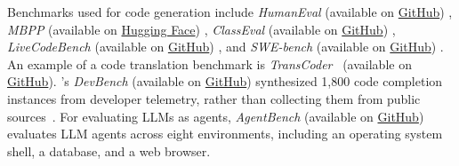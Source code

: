 Benchmarks used for code generation include \emph{HumanEval} (available on \href{https://github.com/openai/human-eval}{GitHub}) \cite{DBLP:journals/corr/abs-2107-03374}, \emph{MBPP} (available on \href{https://huggingface.co/datasets/google-research-datasets/mbpp}{Hugging Face}) \cite{DBLP:journals/corr/abs-2108-07732},
\emph{ClassEval} (available on \href{https://github.com/FudanSELab/ClassEval}{GitHub}) \cite{DBLP:conf/icse/Du0WWL0FS0L24}, \emph{LiveCodeBench} (available on \href{https://github.com/LiveCodeBench/LiveCodeBench}{GitHub}) \cite{DBLP:journals/corr/abs-2403-07974}, and \emph{SWE-bench} (available on \href{https://github.com/swe-bench/SWE-bench}{GitHub}) \cite{DBLP:conf/iclr/JimenezYWYPPN24}.
An example of a code translation benchmark is \emph{TransCoder}~\cite{DBLP:conf/nips/RoziereLCL20} (available on \href{https://github.com/facebookresearch/CodeGen}{GitHub}).
\citeauthor{DBLP:journals/corr/abs-2601-11895}'s \emph{DevBench} (available on \href{https://github.com/microsoft/devbench}{GitHub}) synthesized 1,800 code completion instances from developer telemetry, rather than collecting them from public sources~\cite{DBLP:journals/corr/abs-2601-11895}.
For evaluating LLMs as agents, \emph{AgentBench} (available on \href{https://github.com/THUDM/AgentBench}{GitHub})~\cite{DBLP:conf/iclr/0036YZXLL0DMYZ024} evaluates LLM agents across eight environments, including an operating system shell, a database, and a web browser.

